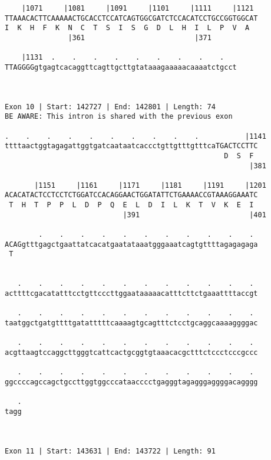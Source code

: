 \documentclass{article}
\begin{document}
\begin{Verbatim}
    |1071     |1081     |1091     |1101     |1111     |1121 
TTAAACACTTCAAAAACTGCACCTCCATCAGTGGCGATCTCCACATCCTGCCGGTGGCAT
I  K  H  F  K  N  C  T  S  I  S  G  D  L  H  I  L  P  V  A  
               |361                          |371           
  
    |1131  .    .    .    .    .    .    .    .    .   
TTAGGGGgtgagtcacaggttcagttgcttgtataaagaaaaacaaaatctgcct
                                                       
  
 
Exon 10 | Start: 142727 | End: 142801 | Length: 74
BE AWARE: This intron is shared with the previous exon
 
.    .    .    .    .    .    .    .    .    .           |1141
ttttaactggtagagattggtgatcaataatcaccctgttgtttgtttcaTGACTCCTTC
                                                    D  S  F 
                                                          |381
  
       |1151     |1161     |1171     |1181     |1191     |1201
ACACATACTCCTCCTCTGGATCCACAGGAACTGGATATTCTGAAAACCGTAAAGGAAATC
 T  H  T  P  P  L  D  P  Q  E  L  D  I  L  K  T  V  K  E  I 
                            |391                          |401
  
        .    .    .    .    .    .    .    .    .    .    . 
ACAGgtttgagctgaattatcacatgaatataaatgggaaatcagtgttttagagagaga
 T                                                          
                                                            
  
   .    .    .    .    .    .    .    .    .    .    .    . 
acttttcgacatatttcctgttcccttggaataaaaacatttcttctgaaattttaccgt
                                                            
   .    .    .    .    .    .    .    .    .    .    .    . 
taatggctgatgttttgatatttttcaaaagtgcagtttctcctgcaggcaaaaggggac
                                                            
   .    .    .    .    .    .    .    .    .    .    .    . 
acgttaagtccaggcttgggtcattcactgcggtgtaaacacgctttctccctcccgccc
                                                            
   .    .    .    .    .    .    .    .    .    .    .    . 
ggccccagccagctgccttggtggcccataacccctgagggtagagggaggggacagggg
                                                            
   .
tagg
    
    
 
Exon 11 | Start: 143631 | End: 143722 | Length: 91
 

\end{Verbatim}
\end{document}
